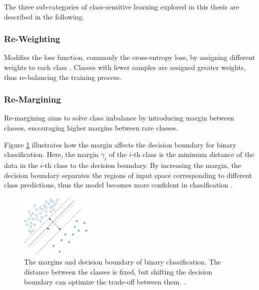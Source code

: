 The three sub-categories of class-sensitive learning explored in this thesis are described in the following.

\subsubsection{Re-Weighting}
\label{sec:re-weighting}
Modifies the loss function, commonly the cross-entropy loss, by assigning different weights to each class \cite{zhang2023deep}. Classes with fewer samples are assigned greater weights, thus re-balancing the training process.

\subsubsection{Re-Margining}
\label{sec:re-margining}
Re-margining aims to solve class imbalance by introducing margin between classes, encouraging higher margins between rare classes. 

Figure \ref{fig:decision_boundaries} illustrates how the margin affects the decision boundary for binary classification. Here, the margin $\gamma_i$ of the $i$-th class is the minimum distance of the data in the $i$-th class to the decision boundary.  By increasing the margin, the decision boundary separates the regions of input space corresponding to different class predictions, thus the model becomes more confident in classification \cite{cao2019learningimbalanceddatasetslabeldistributionaware}.


\begin{figure}[ht]
    \centering
    \includegraphics[width=0.3\textwidth]{Images/margin.drawio.png} 
    \caption{The margins and decision boundary of binary classification. The distance between the classes is fixed, but shifting the decision boundary can optimize the trade-off between them. \cite{cao2019learningimbalanceddatasetslabeldistributionaware}.}
    \label{fig:decision_boundaries} 
\end{figure}



